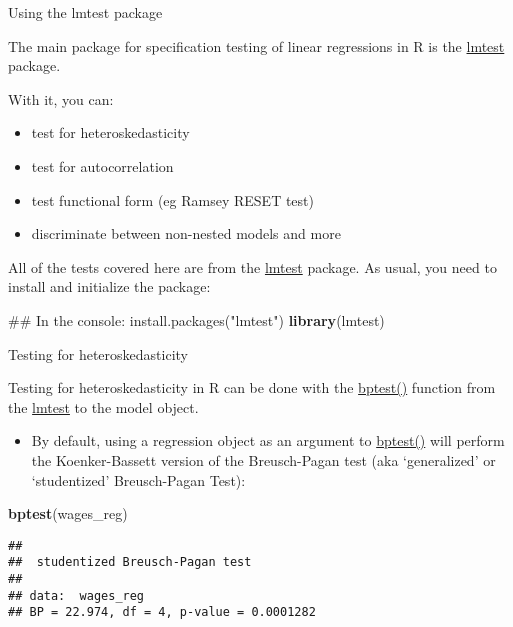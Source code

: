\documentclass[ignorenonframetext,]{beamer}
\newenvironment{Shaded}{\begin{snugshade}}{\end{snugshade}}
\newcommand{\KeywordTok}[1]{\textcolor[rgb]{0.26,0.66,0.93}{\textbf{#1}}}
\newcommand{\NormalTok}[1]{\textcolor[rgb]{0.74,0.68,0.62}{#1}}
\providecommand{\tightlist}{%
  \setlength{\itemsep}{0pt}\setlength{\parskip}{0pt}}
\begin{document}
\begin{frame}[fragile]{Using the lmtest package}

The main package for specification testing of linear regressions in R is
the \href{https://www.rdocumentation.org/packages/lmtest/}{lmtest}
package.

With it, you can:

\begin{itemize}
\tightlist
\item
  test for heteroskedasticity
\item
  test for autocorrelation
\item
  test functional form (eg Ramsey RESET test)
\item
  discriminate between non-nested models and more
\end{itemize}

All of the tests covered here are from the
\href{https://www.rdocumentation.org/packages/lmtest/}{lmtest} package.
As usual, you need to install and initialize the package:

\begin{Shaded}
\begin{Highlighting}[]
\NormalTok{## In the console:  install.packages("lmtest")}
\KeywordTok{library}\NormalTok{(lmtest)}
\end{Highlighting}
\end{Shaded}

\end{frame}

\begin{frame}[fragile]{Testing for heteroskedasticity}

Testing for heteroskedasticity in R can be done with the
\href{https://www.rdocumentation.org/packages/lmtest/versions/0.9-35/topics/bptest}{bptest()}
function from the
\href{https://www.rdocumentation.org/packages/lmtest}{lmtest} to the
model object.

\begin{itemize}
\tightlist
\item
  By default, using a regression object as an argument to
  \href{https://www.rdocumentation.org/packages/lmtest/versions/0.9-35/topics/bptest}{bptest()}
  will perform the Koenker-Bassett version of the Breusch-Pagan test
  (aka `generalized' or `studentized' Breusch-Pagan Test):
\end{itemize}

\begin{Shaded}
\begin{Highlighting}[]
\KeywordTok{bptest}\NormalTok{(wages_reg)}
\end{Highlighting}
\end{Shaded}

\begin{verbatim}
## 
##  studentized Breusch-Pagan test
## 
## data:  wages_reg
## BP = 22.974, df = 4, p-value = 0.0001282
\end{verbatim}

\end{frame}
\end{document}
